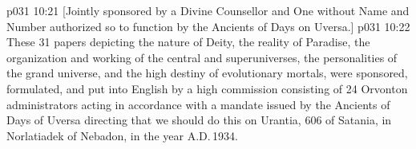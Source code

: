\vsetoff
\vs p031 10:21 [Jointly sponsored by a Divine Counsellor and One without Name and Number authorized so to function by the Ancients of Days on Uversa.]
\separatorline
\vs p031 10:22 These 31 papers depicting the nature of Deity, the reality of Paradise, the organization and working of the central and superuniverses, the personalities of the grand universe, and the high destiny of evolutionary mortals, were sponsored, formulated, and put into English by a high commission consisting of 24 Orvonton administrators acting in accordance with a mandate issued by the Ancients of Days of Uversa directing that we should do this on Urantia, 606 of Satania, in Norlatiadek of Nebadon, in the year A.D.\,1934.
\quizlink
